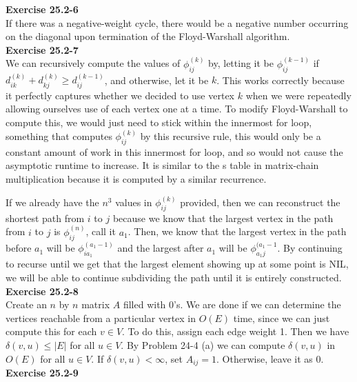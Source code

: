 \documentclass{article}
\begin{document}
\noindent\textbf{Exercise 25.2-6}\\

If there was a negative-weight cycle, there would be a negative number occurring on the diagonal upon termination of the Floyd-Warshall algorithm.  \\

\noindent\textbf{Exercise 25.2-7}\\
We can recursively compute the values of $\phi_{ij}^{(k)}$ by, letting it be $\phi_{ij}^{(k-1)}$ if $d_{ik}^{(k)} + d_{kj}^{(k)} \ge d_{ij}^{(k-1)}$, and otherwise, let it be $k$. This works correctly because it perfectly captures whether we decided to use vertex $k$ when we were repeatedly allowing ourselves use of each vertex one at a time. To modify Floyd-Warshall to compute this, we would just need to stick within the innermost for loop, something that computes $\phi_{ij}^{(k)}$ by this recursive rule, this would only be a constant amount of work in this innermost for loop, and so would not cause the asymptotic runtime to increase. It is similar to the s table in matrix-chain multiplication because it is computed by a similar recurrence.

If we already have the $n^3$ values in $\phi_{ij}^{(k)}$ provided, then we can reconstruct the shortest path from $i$ to $j$ because we know that the largest vertex in the path from $i$ to $j$ is $\phi_{ij}^{(n)}$, call it $a_1$. Then, we know that the largest vertex in the path before $a_1$ will be $\phi_{ia_1}^{(a_1-1)}$ and the largest after $a_1$ will be $\phi_{a_1j}^{(a_1-1}$. By continuing to recurse until we get that the largest element showing up at some point is NIL, we will be able to continue subdividing the path until it is entirely constructed. \\

\noindent\textbf{Exercise 25.2-8}\\

Create an $n$ by $n$ matrix $A$ filled with 0's.  We are done if we can determine the vertices reachable from a particular vertex in $O(E)$ time, since we can just compute this for each $v \in V$. To do this, assign each edge weight 1.  Then we have $\delta(v,u) \leq |E|$ for all $u \in V$.  By Problem 24-4 (a) we can compute $\delta(v,u)$ in $O(E)$ for all $u \in V$.  If $\delta(v,u) < \infty$, set $A_{ij} = 1$.  Otherwise, leave it as 0.  \\

\noindent\textbf{Exercise 25.2-9}\\
\end{document}
